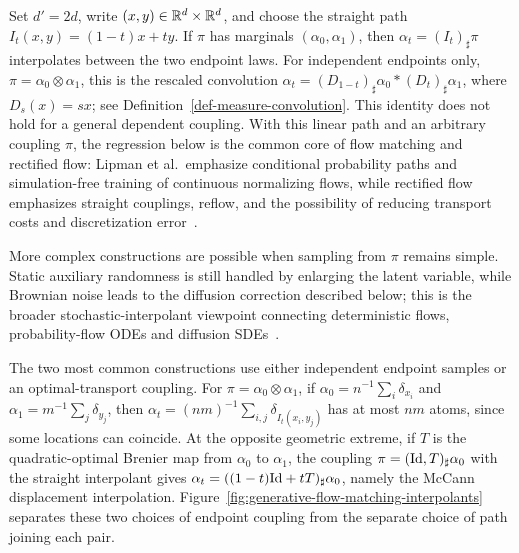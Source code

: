 \begin{example}
	Set $d'=2d$, write $(x,y)\in\mathbb{R}^d\times\mathbb{R}^d$, and choose the straight path $I_t(x,y)=(1-t)x+ty$. If $\pi$ has marginals $(\alpha_0,\alpha_1)$, then $\alpha_t=(I_t)_\sharp\pi$ interpolates between the two endpoint laws. For independent endpoints only, $\pi=\alpha_0\otimes\alpha_1$, this is the rescaled convolution $\alpha_t=(D_{1-t})_\sharp\alpha_0*(D_t)_\sharp\alpha_1$, where $D_s(x)=sx$; see Definition~\ref{def-measure-convolution}. This identity does not hold for a general dependent coupling.
	With this linear path and an arbitrary coupling $\pi$, the regression below is the common core of flow matching and rectified flow: Lipman et al.\ emphasize conditional probability paths and simulation-free training of continuous normalizing flows, while rectified flow emphasizes straight couplings, reflow, and the possibility of reducing transport costs and discretization error~\cite{Lipman2022FlowMatching,Liu2023RectifiedFlow}.

	More complex constructions are possible when sampling from $\pi$ remains simple. Static auxiliary randomness is still handled by enlarging the latent variable, while Brownian noise leads to the diffusion correction described below; this is the broader stochastic-interpolant viewpoint connecting deterministic flows, probability-flow ODEs and diffusion SDEs~\cite{Albergo2025StochasticInterpolants}.
\end{example}

\begin{rem}
The two most common constructions use either independent endpoint samples or an optimal-transport coupling. For $\pi=\alpha_0\otimes\alpha_1$, if $\alpha_0=n^{-1}\sum_i\delta_{x_i}$ and $\alpha_1=m^{-1}\sum_j\delta_{y_j}$, then $\alpha_t=(nm)^{-1}\sum_{i,j}\delta_{I_t(x_i,y_j)}$ has at most $nm$ atoms, since some locations can coincide. At the opposite geometric extreme, if $T$ is the quadratic-optimal Brenier map from $\alpha_0$ to $\alpha_1$, the coupling $\pi=(\mathrm{Id},T)_\sharp\alpha_0$ with the straight interpolant gives $\alpha_t=((1-t)\mathrm{Id}+tT)_\sharp\alpha_0$, namely the McCann displacement interpolation. Figure~\ref{fig:generative-flow-matching-interpolants} separates these two choices of endpoint coupling from the separate choice of path joining each pair.
\end{rem}

